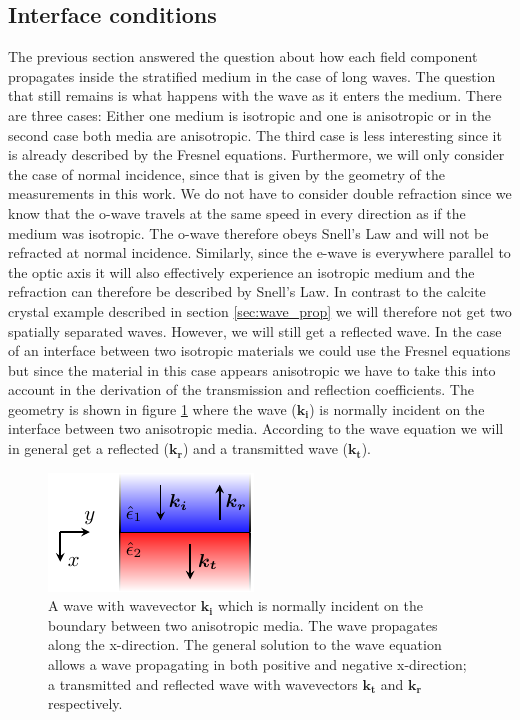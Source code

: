 \subsection{Interface conditions}
\label{sec:interface_conditions}
The previous section answered the question about how each field component propagates inside the stratified medium in the case of long waves. The question that still remains is what happens with the wave as it enters the medium. There are three cases: Either one medium is isotropic and one is anisotropic or in the second case both media are anisotropic. The third case is less interesting since it is already described by the Fresnel equations. Furthermore, we will only consider the case of normal incidence, since that is given by the geometry of the measurements in this work. We do not have to consider double refraction since we know that the o-wave travels at the same speed in every direction as if the medium was isotropic. The o-wave therefore obeys Snell's Law and will not be refracted at normal incidence. Similarly, since the e-wave is everywhere parallel to the optic axis it will also effectively experience an isotropic medium and the refraction can therefore be described by Snell's Law. In contrast to the calcite crystal example described in section \ref{sec:wave_prop} we will therefore not get two spatially separated waves. However, we will still get a reflected wave. In the case of an interface between two isotropic materials we could use the Fresnel equations but since the material in this case appears anisotropic we have to take this into account in the derivation of the transmission and reflection coefficients. The geometry is shown in figure \ref{fig:interface_derivation} where the wave ($\bm{k_i}$) is normally incident on the interface between two anisotropic media. According to the wave equation we will in general get a reflected ($\bm{k_r}$) and a transmitted wave ($\bm{k_t}$). 

\begin{figure}[h]
    \centering
    \includegraphics[scale=2.7]{images/theory/tikz_interface_derivation.pdf}
    \caption{A wave with wavevector $\bm{k_i}$ which is normally incident on the boundary between two anisotropic media. The wave propagates along the x-direction. The general solution to the wave equation allows a wave propagating in both positive and negative x-direction; a transmitted and reflected wave with wavevectors $\bm{k_t}$ and $\bm{k_r}$ respectively.}
    \label{fig:interface_derivation}
\end{figure}

